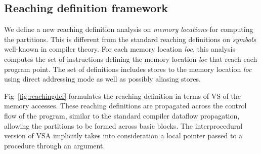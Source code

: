 
\subsection{Reaching definition framework}

We define a new reaching definition analysis on \emph{memory locations} for computing the partitions. This is different from the standard reaching definitions on \emph{symbols} well-known in compiler theory. For each memory location \emph{loc}, this analysis computes the set of instructions defining the memory location \emph{loc} that reach each program point. The set of definitions includes stores to the memory location \emph{loc} using direct addressing mode as well as possibly aliasing stores.

Fig~\ref{fig:reachingdef} formulates the reaching definition in terms of VS of the memory accesses. These reaching definitions are propagated across the control flow of the program, similar to the standard compiler dataflow propagation, allowing the partitions to be formed across basic blocks. The interprocedural version of VSA implicitly takes into consideration a local pointer passed to a procedure through an argument.

